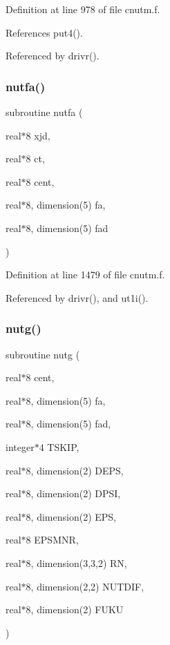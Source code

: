 Definition at line 978 of file cnutm.\+f.



References put4().



Referenced by drivr().

\mbox{\label{cnutm_8f_a51fadb52934f7a3845784c1c1d5ff7c4}} 
\subsubsection{\texorpdfstring{nutfa()}{nutfa()}}
{\footnotesize\ttfamily subroutine nutfa (\begin{DoxyParamCaption}\item[{real$\ast$8}]{xjd,  }\item[{real$\ast$8}]{ct,  }\item[{real$\ast$8}]{cent,  }\item[{real$\ast$8, dimension(5)}]{fa,  }\item[{real$\ast$8, dimension(5)}]{fad }\end{DoxyParamCaption})}



Definition at line 1479 of file cnutm.\+f.



Referenced by drivr(), and ut1i().

\mbox{\label{cnutm_8f_a1f3f4250e6bf2547e3d3d5311f6ac534}} 
\subsubsection{\texorpdfstring{nutg()}{nutg()}}
{\footnotesize\ttfamily subroutine nutg (\begin{DoxyParamCaption}\item[{real$\ast$8}]{cent,  }\item[{real$\ast$8, dimension(5)}]{fa,  }\item[{real$\ast$8, dimension(5)}]{fad,  }\item[{integer$\ast$4}]{T\+S\+K\+IP,  }\item[{real$\ast$8, dimension(2)}]{D\+E\+PS,  }\item[{real$\ast$8, dimension(2)}]{D\+P\+SI,  }\item[{real$\ast$8, dimension(2)}]{E\+PS,  }\item[{real$\ast$8}]{E\+P\+S\+M\+NR,  }\item[{real$\ast$8, dimension(3,3,2)}]{RN,  }\item[{real$\ast$8, dimension(2,2)}]{N\+U\+T\+D\+IF,  }\item[{real$\ast$8, dimension(2)}]{F\+U\+KU }\end{DoxyParamCaption})}



